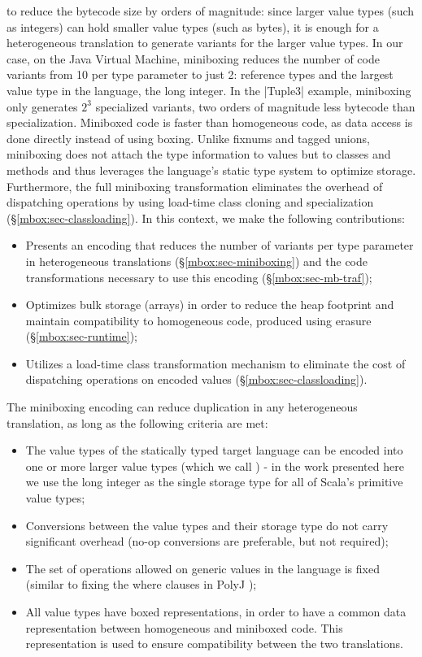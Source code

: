  to reduce the bytecode size by orders of magnitude: since larger value types (such as integers) can hold smaller value types (such as bytes), it is enough for a heterogeneous translation to generate variants for the larger value types. In our case, on the Java Virtual Machine, miniboxing reduces the number of code variants from 10 per type parameter to just 2: reference types and the largest value type in the language, the long integer. In the |Tuple3| example, miniboxing only generates $2^3$ specialized variants, two orders of magnitude less bytecode than specialization. Miniboxed code is faster than homogeneous code, as data access is done directly instead of using boxing. Unlike fixnums and tagged unions, miniboxing does not attach the type information to values but to classes and methods and thus leverages the language's static type system to optimize storage. Furthermore, the full miniboxing transformation eliminates the overhead of dispatching operations by using load-time class cloning and specialization (\S\ref{mbox:sec-classloading}). In this context, we make the following contributions:  

\begin{itemize}
  \item Presents an encoding that reduces the number of variants per type parameter in heterogeneous translations (\S{}\ref{mbox:sec-miniboxing}) and the code transformations necessary to use this encoding (\S\ref{mbox:sec-mb-traf});
  \item Optimizes bulk storage (arrays) in order to reduce the heap footprint and maintain compatibility to homogeneous code, produced using erasure (\S{}\ref{mbox:sec-runtime});
  \item Utilizes a load-time class transformation mechanism to eliminate the cost of dispatching operations on encoded values (\S{}\ref{mbox:sec-classloading}).
\end{itemize}  

The miniboxing encoding can reduce duplication in any heterogeneous translation, as long as the following criteria are met:
\begin{itemize}
  \item The value types of the statically typed target language can be encoded into one or more larger value types (which we call ) - in the work presented here we use the long integer as the single storage type for all of Scala's primitive value types;
  \item Conversions between the value types and their storage type do not carry significant overhead (no-op conversions are preferable, but not required);
  \item The set of operations allowed on generic values in the language is fixed (similar to fixing the where clauses in PolyJ \cite{myers-polyj});
  \item All value types have boxed representations, in order to have a common data representation between homogeneous and miniboxed code. This representation is used to ensure compatibility between the two translations.
\end{itemize}

